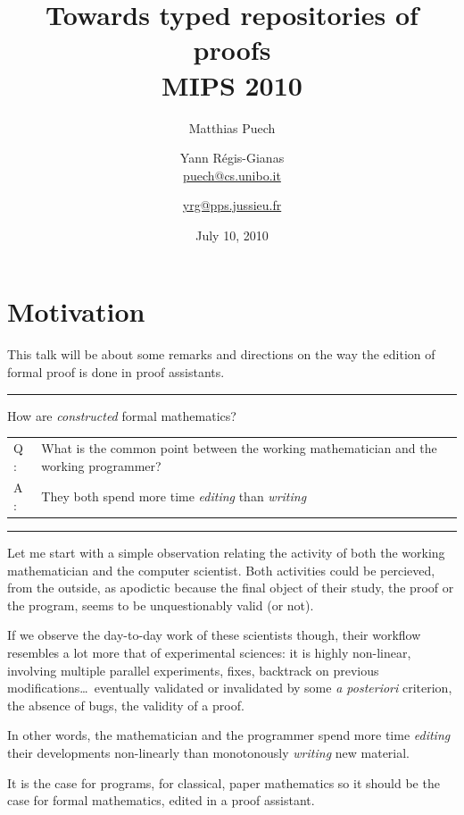 \documentclass[12pt]{article} \usepackage{beamerarticle} \usepackage{fullpage}
\title{Towards typed repositories of proofs \\[0.6em] 
  \small \textsf{MIPS 2010}}
\date{July 10, 2010}
\author[Matthias Puech \& Yann Régis-Gianas] {
Matthias Puech\inst{1} \and Yann Régis-Gianas\inst{2} \\
{\small \url{puech@cs.unibo.it}} \and {\small \url{yrg@pps.jussieu.fr}}
}
\institute {
  \inst 1 {\small Dept. of Computer Science, University of Bologna} \and
  \inst 2 {\small University Paris 7, CNRS, and INRIA, PPS, team ${\pi}r^2$}
}
\begin{document}
\begin{frame}
  \titlepage
\end{frame}

\section{Motivation}

This talk will be about some remarks and directions on the way the
edition of formal proof is done in proof assistants.

\hrule
\begin{frame}{How are \emph{constructed} formal mathematics?}
  \large
  \begin{tabular}{ll}
    {\Huge Q :} & \parbox{0.8\textwidth}{What is the common point between the working
      mathematician and the working programmer?} \\[2em]
    \pause
    {\Huge A :} & They both spend more time \emph{editing} than \emph{writing}
  \end{tabular}
\end{frame}
\hrule

Let me start with a simple observation relating the activity of both
the working mathematician and the computer scientist. Both activities
could be percieved, from the outside, as apodictic because the final
object of their study, the proof or the program, seems to be
unquestionably valid (or not).

If we observe the day-to-day work of these scientists though, their
workflow resembles a lot more that of experimental sciences: it is
highly non-linear, involving multiple parallel experiments, fixes,
backtrack on previous modifications\ldots\ eventually validated or
invalidated by some \emph{a posteriori} criterion, the absence of
bugs, the validity of a proof.

In other words, the mathematician and the programmer spend more time
\emph{editing} their developments non-linearly than monotonously
\emph{writing} new material.

It is the case for programs, for classical, paper mathematics so it
should be the case for formal mathematics, edited in a proof
assistant.
\end{document}
